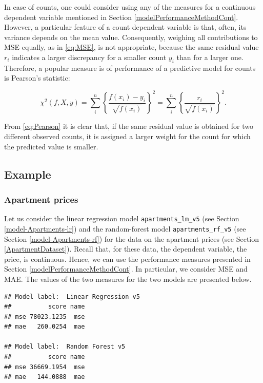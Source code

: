 \documentclass[12pt,]{krantz}
\begin{document}
In case of counts, one could consider using any of the measures for a continuous dependent variable mentioned in Section \ref{modelPerformanceMethodCont}. However, a particular feature of a count dependent variable is that, often, its variance depends on the mean value. Consequently, weighing all contributions to MSE equally, as in \eqref{eq:MSE}, is not appropriate, because the same residual value \(r_i\) indicates a larger discrepancy for a smaller count \(y_i\) than for a larger one. Therefore, a popular measure is of performance of a predictive model for counts is Pearson's statistic:

\begin{equation}
\chi^2(f,X,y) = \sum_{i}^{n} \left\{\frac{f(x_i) - y_i}{\sqrt{f(x_i)}}\right\}^2 = \sum_{i}^{n} \left\{\frac{r_i}{\sqrt{f(x_i)}}\right\}^2.
\label{eq:Pearson}
\end{equation}

From \eqref{eq:Pearson} it is clear that, if the same residual value is obtained for two different observed counts, it is assigned a larger weight for the count for which the predicted value is smaller.

\hypertarget{example}{%
\subsection{Example}\label{example}}

\hypertarget{modelPerformanceApartments}{%
\subsubsection{Apartment prices}\label{modelPerformanceApartments}}

Let us consider the linear regression model \texttt{apartments\_lm\_v5} (see Section \ref{model-Apartments-lr}) and the random-forest model \texttt{apartments\_rf\_v5} (see Section \ref{model-Apartments-rf}) for the data on the apartment prices (see Section \ref{ApartmentDataset}). Recall that, for these data, the dependent variable, the price, is continuous. Hence, we can use the performance measures presented in Section \ref{modelPerformanceMethodCont}. In particular, we consider MSE and MAE. The values of the two measures for the two models are presented below.

\begin{verbatim}
## Model label:  Linear Regression v5 
##          score name
## mse 78023.1235  mse
## mae   260.0254  mae

## Model label:  Random Forest v5 
##          score name
## mse 36669.1954  mse
## mae   144.0888  mae
\end{verbatim}
\end{document}
